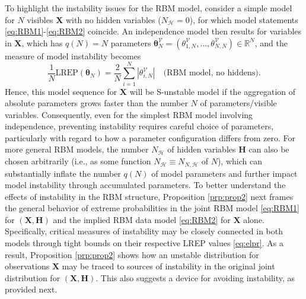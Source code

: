 \documentclass[numbib]{imamat}
\theoremstyle{theorem}
\theoremstyle{lemma}
\theoremstyle{example}
\theoremstyle{corollary}
\theoremstyle{definition}
\theoremstyle{remark}
\theoremstyle{approximation}
\theoremstyle{scheme}
\newcommand{\REP}{\mathrm{LREP}}
\newcommand{\ak}[1]{{\color{blue} #1}}
\begin{document}
To highlight the instability issues for the RBM model, consider a simple model for \(N\) visibles \(\boldsymbol X\) with no hidden variables (\(N_{\mathcal{H}}=0\)), for which model statements \eqref{eq:RBM1}-\eqref{eq:RBM2} coincide. An independence model then results for variables in \(\boldsymbol X\), which has \(q(N)=N\) parameters \(\boldsymbol \theta_N^{\mathcal{V}} = (\theta_{1,N}^{\mathcal{V}}, \ldots, \theta_{N,N}^{\mathcal{V}}) \in \mathbb{R}^{N}\), and the measure of model instability becomes
\[
\frac{1}{N}\REP(\boldsymbol \theta_N) = \frac{2}{N} \sum_{i=1}^N|\theta_{i,N}^{\mathcal{V}}| \quad \text{(RBM model, no hiddens)}.
\]
Hence, this model sequence for \(\boldsymbol X\) will be S-unstable model if the aggregation of absolute parameters grows faster than the number \(N\) of parameters/visible variables. Consequently, even for \ak{the} simplest RBM model involving independence, preventing instability requires careful choice of parameters, particularly with regard to how a parameter configuration differs from zero. For more general RBM models, the number \(N_{\mathcal{H}}\) of hidden variables \(\boldsymbol H\) can also be chosen arbitrarily (i.e., as some function \(N_{\mathcal{H}}\equiv N_{N,\mathcal{H}}\) of \(N\)), which can substantially inflate the number \(q(N)\) of model parameters and further impact model instability through accumulated parameters. To better understand the effects of instability in the RBM structure, Proposition \ref{prp:prop2} next frames the general behavior of extreme probabilities in the joint RBM model \eqref{eq:RBM1} for \((\boldsymbol X, \boldsymbol H)\) and the implied RBM data model \eqref{eq:RBM2} for \(\boldsymbol X\) alone. Specifically, critical measures of instability may be closely connected in both models through tight bounds on their respective LREP values \eqref{eq:elpr}. As a result, Proposition \ref{prp:prop2} shows how an unstable distribution for observations \(\boldsymbol X\) may be traced to sources of instability in the original joint distribution for \((\boldsymbol X,\boldsymbol H)\). This also suggests a device for avoiding instability, as provided next.
\end{document}
